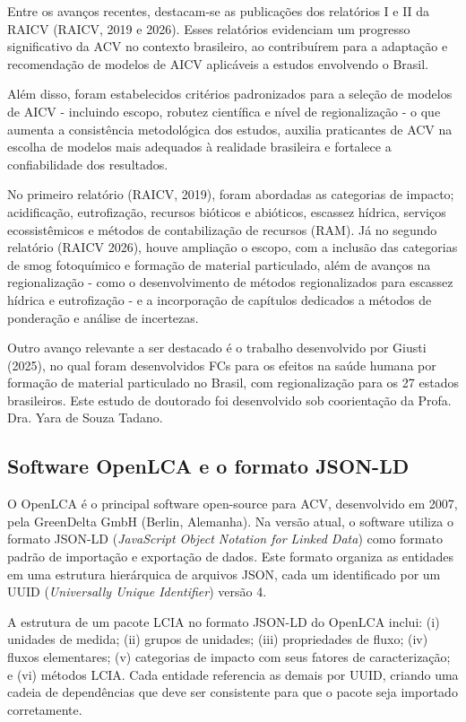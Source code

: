 Entre os avan\c{c}os recentes, destacam-se as publicações dos relatórios I e II da RAICV (RAICV, 2019 e 2026). Esses relatórios evidenciam um progresso significativo da ACV no contexto brasileiro, ao contribuírem para a adaptação e recomendação de modelos de AICV aplicáveis a estudos envolvendo o Brasil.

Além disso, foram estabelecidos critérios padronizados para a seleção de modelos de AICV - incluindo escopo, robutez científica e nível de regionalização - o que aumenta a consistência metodológica dos estudos, auxilia praticantes de ACV na escolha de modelos mais adequados à realidade brasileira e fortalece a confiabilidade dos resultados.

No primeiro relatório (RAICV, 2019), foram abordadas as categorias de impacto; acidificação, eutrofização, recursos bióticos e abióticos, escassez hídrica, serviços ecossistêmicos e métodos de contabilização de recursos (RAM). Já no segundo relatório (RAICV 2026), houve ampliação o escopo, com a inclusão das categorias de smog fotoquímico e formação de material particulado, além de avanços na regionalização - como o desenvolvimento de métodos regionalizados para escassez hídrica e eutrofização - e a incorporação de capítulos dedicados a métodos de ponderação e análise de incertezas.

Outro avanço relevante a ser destacado é o trabalho desenvolvido por Giusti (2025), no qual foram desenvolvidos FCs para os efeitos na sa\'ude humana por forma\c{c}\~ao de material particulado no Brasil, com regionalização para os 27 estados brasileiros. Este estudo de doutorado foi desenvolvido sob coorientação da Profa. Dra. Yara de Souza Tadano.

\subsection{Software OpenLCA e o formato JSON-LD}

O OpenLCA \'e o principal software open-source para ACV, desenvolvido  em 2007, pela GreenDelta GmbH (Berlin, Alemanha). Na vers\~ao atual, o software utiliza o formato JSON-LD (\textit{JavaScript Object Notation for Linked Data}) como formato padr\~ao de importa\c{c}\~ao e exporta\c{c}\~ao de dados. Este formato organiza as entidades em uma estrutura hier\'arquica de arquivos JSON, cada um identificado por um UUID (\textit{Universally Unique Identifier}) vers\~ao 4.

A estrutura de um pacote LCIA no formato JSON-LD do OpenLCA inclui: (i) unidades de medida; (ii) grupos de unidades; (iii) propriedades de fluxo; (iv) fluxos elementares; (v) categorias de impacto com seus fatores de caracteriza\c{c}\~ao; e (vi) m\'etodos LCIA. Cada entidade referencia as demais por UUID, criando uma cadeia de depend\^encias que deve ser consistente para que o pacote seja importado corretamente.


